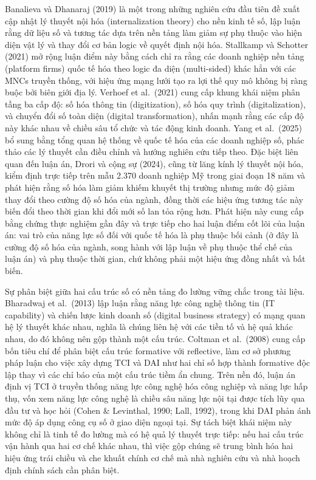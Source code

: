 \documentclass[
  a4paper,
  13pt]{extreport}
\begin{document}
Banalieva và Dhanaraj (2019) là một trong những nghiên cứu đầu tiên đề
xuất cập nhật lý thuyết nội hóa (internalization theory) cho nền kinh tế
số, lập luận rằng dữ liệu số và tương tác dựa trên nền tảng làm giảm sự
phụ thuộc vào hiện diện vật lý và thay đổi cơ bản logic về quyết định
nội hóa. Stallkamp và Schotter (2021) mở rộng luận điểm này bằng cách
chỉ ra rằng các doanh nghiệp nền tảng (platform firms) quốc tế hóa theo
logic đa diện (multi-sided) khác hẳn với các MNCs truyền thống, với hiệu
ứng mạng lưới tạo ra lợi thế quy mô không bị ràng buộc bởi biên giới địa
lý. Verhoef et al.~(2021) cung cấp khung khái niệm phân tầng ba cấp độ:
số hóa thông tin (digitization), số hóa quy trình (digitalization), và
chuyển đổi số toàn diện (digital transformation), nhấn mạnh rằng các cấp
độ này khác nhau về chiều sâu tổ chức và tác động kinh doanh. Yang et
al.~(2025) bổ sung bằng tổng quan hệ thống về quốc tế hóa của các doanh
nghiệp số, phác thảo các lý thuyết cần điều chỉnh và hướng nghiên cứu
tiếp theo. Đặc biệt liên quan đến luận án, Drori và cộng sự (2024), cũng
từ lăng kính lý thuyết nội hóa, kiểm định trực tiếp trên mẫu 2.370 doanh
nghiệp Mỹ trong giai đoạn 18 năm và phát hiện rằng số hóa làm giảm khiếm
khuyết thị trường nhưng mức độ giảm thay đổi theo cường độ số hóa của
ngành, đồng thời các hiệu ứng tương tác này biến đổi theo thời gian khi
đổi mới số lan tỏa rộng hơn. Phát hiện này cung cấp bằng chứng thực
nghiệm gần đây và trực tiếp cho hai luận điểm cốt lõi của luận án: vai
trò của năng lực số đối với quốc tế hóa là phụ thuộc bối cảnh (ở đây là
cường độ số hóa của ngành, song hành với lập luận về phụ thuộc thể chế
của luận án) và phụ thuộc thời gian, chứ không phải một hiệu ứng đồng
nhất và bất biến.

Sự phân biệt giữa hai cấu trúc số có nền tảng đo lường vững chắc trong
tài liệu. Bharadwaj et al.~(2013) lập luận rằng năng lực công nghệ thông
tin (IT capability) và chiến lược kinh doanh số (digital business
strategy) có mạng quan hệ lý thuyết khác nhau, nghĩa là chúng liên hệ
với các tiền tố và hệ quả khác nhau, do đó không nên gộp thành một cấu
trúc. Coltman et al.~(2008) cung cấp bốn tiêu chí để phân biệt cấu trúc
formative với reflective, làm cơ sở phương pháp luận cho việc xây dựng
TCI và DAI như hai chỉ số hợp thành formative độc lập thay vì các chỉ
báo của một cấu trúc tiềm ẩn chung. Trên nền đó, luận án định vị TCI ở
truyền thống năng lực công nghệ hóa công nghiệp và năng lực hấp thụ, vốn
xem năng lực công nghệ là chiều sâu năng lực nội tại được tích lũy qua
đầu tư và học hỏi (Cohen \& Levinthal, 1990; Lall, 1992), trong khi DAI
phản ánh mức độ áp dụng công cụ số ở giao diện ngoại tại. Sự tách biệt
khái niệm này không chỉ là tinh tế đo lường mà có hệ quả lý thuyết trực
tiếp: nếu hai cấu trúc vận hành qua hai cơ chế khác nhau, thì việc gộp
chúng sẽ trung bình hóa hai hiệu ứng trái chiều và che khuất chính cơ
chế mà nhà nghiên cứu và nhà hoạch định chính sách cần phân biệt.
\end{document}
